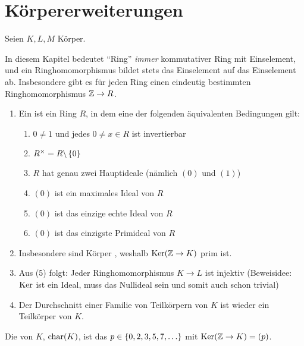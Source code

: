 \section{Körpererweiterungen}
Seien $K,L,M$ Körper.

\begin{bemerkung}
    In diesem Kapitel bedeutet ``Ring'' \textit{immer} kommutativer Ring mit Einselement, und ein Ringhomomorphismus bildet stets das Einselement auf das Einselement ab.
    Insbesondere gibt es für jeden Ring einen eindeutig bestimmten Ringhomomorphismus $\mathbb{Z} \to R$.
\end{bemerkung}

\begin{bemerkung} \label{bemerkung: 1_1.2}
    \begin{enumerate}[leftmargin=*, label=(\alph*)]
        \item Ein  ist ein Ring $R$, in dem eine der folgenden äquivalenten Bedingungen gilt:
        \begin{enumerate}[label=(\arabic*), nolistsep, topsep=-\parskip]
            \item $0 \neq 1$ und jedes $0 \neq x \in R$ ist invertierbar
            \item ${R}^{\times} = R \backslash \left\{ 0 \right\}$
            \item $R$ hat genau zwei Hauptideale (nämlich $(0)$ und $(1)$)
            \item $(0)$ ist ein maximales Ideal von $R$
            \item $(0)$ ist das einzige echte Ideal von $R$
            \item $(0)$ ist das einzigste Primideal von $R$
        \end{enumerate}
        \item Insbesondere sind Körper , weshalb $\operatorname{Ker}(\mathbb{Z} \to K)$ prim ist.
        \item Aus (5) folgt: Jeder Ringhomomorphismus $K \to L$ ist injektiv (Beweisidee: $\operatorname{Ker}$ ist ein Ideal, muss das Nullideal sein und somit auch schon trivial) %
        \item Der Durchschnitt einer Familie von Teilkörpern von $K$ ist wieder ein Teilkörper von $K$.
    \end{enumerate}
\end{bemerkung}

\begin{definition}[Charakteristik]
    Die  von $K$, $\operatorname{char}(K)$, ist das $p \in \set{0,2,3,5,7, \dots}$ mit $\operatorname{Ker}(\mathbb{Z} \to K) = (p)$.
\end{definition}

